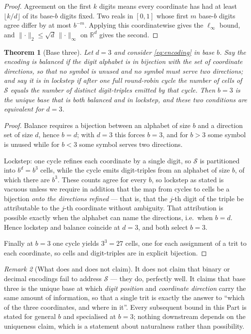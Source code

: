 \documentclass[11pt,twocolumn,a4paper]{article}
\theoremstyle{thmstyle}
\newtheorem{theorem}{Theorem}[section]
\theoremstyle{definition}
\theoremstyle{remark}
\newtheorem{remark}[theorem]{Remark}
\newcommand{\R}{\mathbb{R}}
\newcommand{\Sspace}{\mathcal{S}}
\newcommand{\norm}[1]{\lVert#1\rVert}
\begin{document}
\begin{proof}
Agreement on the first $k$ digits means every coordinate has had at
least $\lfloor k/d\rfloor$ of its base-$b$ digits fixed. Two reals in
$[0,1]$ whose first $m$ base-$b$ digits agree differ by at most
$b^{-m}$. Applying this coordinatewise gives the $\ell_\infty$ bound,
and $\norm{\cdot}_2 \leq \sqrt d\,\norm{\cdot}_\infty$ on $\R^d$ gives
the second.
\end{proof}

\begin{theorem}[Base three]
\label{thm:ternary}
Let $d = 3$ and consider \eqref{eq:encoding} in base $b$. Say the
encoding is \emph{balanced} if the digit alphabet is in bijection with
the set of coordinate directions, so that no symbol is unused and no
symbol must serve two directions; and say it is in \emph{lockstep} if
after one full round-robin cycle the number of cells of $\Sspace$
equals the number of distinct digit-triples emitted by that cycle. Then
$b = 3$ is the unique base that is both balanced and in lockstep, and
these two conditions are equivalent for $d=3$.
\end{theorem}

\begin{proof}
Balance requires a bijection between an alphabet of size $b$ and a
direction set of size $d$, hence $b = d$; with $d = 3$ this forces
$b = 3$, and for $b > 3$ some symbol is unused while for $b<3$ some
symbol serves two directions.

Lockstep: one cycle refines each coordinate by a single digit, so
$\Sspace$ is partitioned into $b^d = b^3$ cells, while the cycle emits
digit-triples from an alphabet of size $b$, of which there are $b^3$.
These counts agree for every $b$, so lockstep as stated is vacuous
unless we require in addition that the map from cycles to cells be a
bijection \emph{onto the directions refined} --- that is, that the
$j$-th digit of the triple be attributable to the $j$-th coordinate
without ambiguity. That attribution is possible exactly when the
alphabet can name the directions, i.e.\ when $b = d$. Hence lockstep
and balance coincide at $d = 3$, and both select $b = 3$.

Finally at $b = 3$ one cycle yields $3^3 = 27$ cells, one for each
assignment of a trit to each coordinate, so cells and digit-triples are
in explicit bijection.
\end{proof}

\begin{remark}[What  does and does not claim]
\label{rem:ternary-honest}
It does not claim that binary or decimal encodings fail to address
$\Sspace$ --- they do, perfectly well. It claims that base three is the
unique base at which \emph{digit position} and \emph{coordinate
direction} carry the same amount of information, so that a single trit
is exactly the answer to ``which of the three coordinates, and
where in it''. Every subsequent bound in this Part is stated for
general $b$ and specialised at $b=3$; nothing downstream depends on the
uniqueness claim, which is a statement about naturalness rather than
possibility.
\end{remark}
\end{document}
